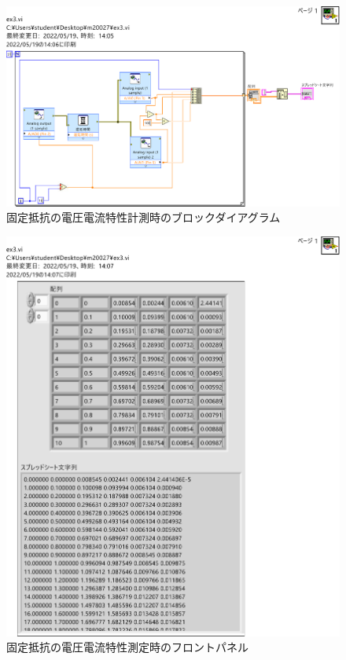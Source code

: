 \begin{figure}[h]
\centering
\includegraphics[scale=0.5]{./fig/ex31-block.pdf}\\
\useMycounter[\label{ex31-block}]固定抵抗の電圧電流特性計測時のブロックダイアグラム
\end{figure}
\begin{figure}[h]
\centering
\includegraphics[scale=0.5]{./fig/ex31-flont.pdf}
\caption{固定抵抗の電圧電流特性測定時のフロントパネル}
\label{fig:ex31-flont}
\end{figure}

